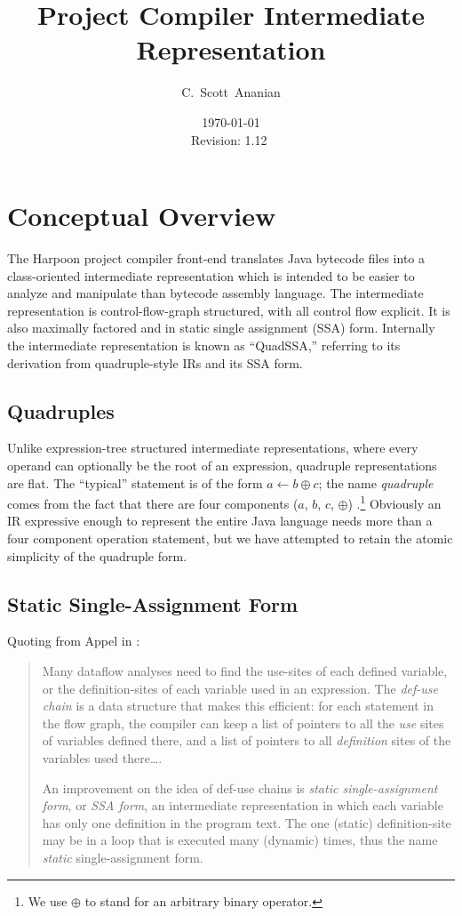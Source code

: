 \documentclass[11pt,notitlepage,twocolumn,twoside]{article}
\author{C.~Scott~Ananian}
\title{\Harpoon{} Project Compiler Intermediate Representation}
\date{\today \\ $ $Revision: 1.12 $ $}
\newcommand{\Harpoon}{Harpoon}%
\begin{document}

\maketitle

\section{Conceptual Overview}

The \Harpoon{} project compiler front-end translates Java bytecode files
into a class-oriented intermediate representation which is intended to
be easier to analyze and manipulate than bytecode assembly language.
The intermediate representation is control-flow-graph structured, with
all control flow explicit.  It is also maximally factored and in
static single assignment (SSA) form.  Internally the intermediate
representation is known as ``QuadSSA,'' referring
to its derivation from quadruple-style IRs and its SSA form.

\subsection{Quadruples}
Unlike expression-tree structured intermediate representations, where
every operand can optionally be the root of an expression, quadruple
representations are flat.  The ``typical'' statement is of the form
$a \leftarrow b \oplus c$; the name \textit{quadruple} comes from the fact
that there are four components ($a$, $b$, $c$, $\oplus$)
\cite{appel:modern}.\footnote{We use $\oplus$ to stand for an arbitrary
binary operator.}  Obviously an IR expressive enough to represent the
entire Java language needs more than a four component operation
statement, but we have attempted to retain the atomic simplicity
of the quadruple form.

\subsection{Static Single-Assignment Form}

Quoting from Appel in \cite{appel:modern}:
\begin{quote}
Many dataflow analyses need to find the use-sites of each defined
variable, or the definition-sites of each variable used in an
expression.  The \textit{def-use chain} is a data structure that makes
this efficient: for each statement in the flow graph, the compiler can
keep a list of pointers to all the \textit{use} sites of variables
defined there, and a list of pointers to all \textit{definition} sites
of the variables used there\ldots .

An improvement on the idea of def-use chains is \textit{static
single-assignment form}, or \textit{SSA form}, an intermediate
representation in which each variable has only one definition in the
program text.  The one (static) definition-site may be in a loop that
is executed many (dynamic) times, thus the name \textit{static}
single-assignment form.
\end{quote}
\end{document}
